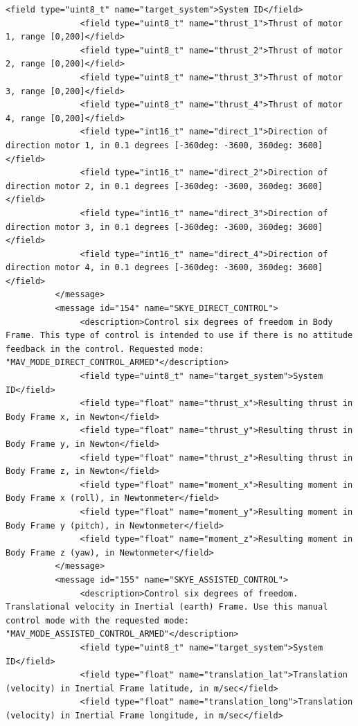 \begin{lstlisting}[captionpos=b, caption="Definition of \textsc{Skye} specific Mavlink messages", label=app_xml]
               <field type="uint8_t" name="target_system">System ID</field>
               <field type="uint8_t" name="thrust_1">Thrust of motor 1, range [0,200]</field>
               <field type="uint8_t" name="thrust_2">Thrust of motor 2, range [0,200]</field>
               <field type="uint8_t" name="thrust_3">Thrust of motor 3, range [0,200]</field>
               <field type="uint8_t" name="thrust_4">Thrust of motor 4, range [0,200]</field>
               <field type="int16_t" name="direct_1">Direction of direction motor 1, in 0.1 degrees [-360deg: -3600, 360deg: 3600] </field>
               <field type="int16_t" name="direct_2">Direction of direction motor 2, in 0.1 degrees [-360deg: -3600, 360deg: 3600] </field>
               <field type="int16_t" name="direct_3">Direction of direction motor 3, in 0.1 degrees [-360deg: -3600, 360deg: 3600] </field>
               <field type="int16_t" name="direct_4">Direction of direction motor 4, in 0.1 degrees [-360deg: -3600, 360deg: 3600] </field>
          </message>
          <message id="154" name="SKYE_DIRECT_CONTROL">
               <description>Control six degrees of freedom in Body Frame. This type of control is intended to use if there is no attitude feedback in the control. Requested mode: "MAV_MODE_DIRECT_CONTROL_ARMED"</description>
               <field type="uint8_t" name="target_system">System ID</field>
               <field type="float" name="thrust_x">Resulting thrust in Body Frame x, in Newton</field>
               <field type="float" name="thrust_y">Resulting thrust in Body Frame y, in Newton</field>
               <field type="float" name="thrust_z">Resulting thrust in Body Frame z, in Newton</field>
               <field type="float" name="moment_x">Resulting moment in Body Frame x (roll), in Newtonmeter</field>
               <field type="float" name="moment_y">Resulting moment in Body Frame y (pitch), in Newtonmeter</field>
               <field type="float" name="moment_z">Resulting moment in Body Frame z (yaw), in Newtonmeter</field>
          </message>
          <message id="155" name="SKYE_ASSISTED_CONTROL">
               <description>Control six degrees of freedom. Translational velocity in Inertial (earth) Frame. Use this manual control mode with the requested mode: "MAV_MODE_ASSISTED_CONTROL_ARMED"</description>
               <field type="uint8_t" name="target_system">System ID</field>
               <field type="float" name="translation_lat">Translation (velocity) in Inertial Frame latitude, in m/sec</field>
               <field type="float" name="translation_long">Translation (velocity) in Inertial Frame longitude, in m/sec</field>

\end{lstlisting}
